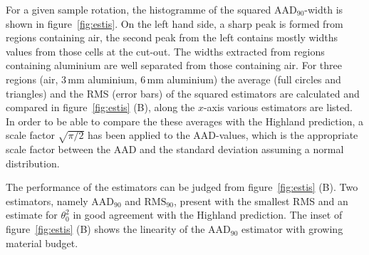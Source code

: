 \documentclass{PoS}
\newcommand{\rmsninety}{\ensuremath{\textrm{RMS}_\textrm{90}}}
\newcommand{\aadninety}{\ensuremath{\textrm{AAD}_\textrm{90}}}
\begin{document}
%

For a given sample rotation, the histogramme of the squared $\aadninety$-width is shown in figure~\ref{fig:estis}.
On the left hand side, a sharp peak is formed from regions containing air, the second peak from the left contains mostly widths values from those cells at the cut-out.
The widths extracted from regions containing aluminium are well separated from those containing air. 
For three regions (air, 3\,mm aluminium, 6\,mm aluminium) the average (full circles and triangles) and the RMS (error bars) of the squared estimators are calculated and compared in figure~\ref{fig:estis} (B), 
 along the $x$-axis various estimators are listed. 
In order to be able to compare the these averages with the Highland prediction, a scale factor $\sqrt{\pi/2}$
 has been applied to the AAD-values, which is the appropriate scale factor between the AAD and the standard deviation assuming a normal distribution. 

The performance of the estimators can be judged from figure~\ref{fig:estis} (B).
Two estimators, namely $\aadninety$ and $\rmsninety$, present with the smallest RMS and an estimate for $\theta_0^2$ in good agreement with the Highland prediction. 
The inset of figure~\ref{fig:estis} (B) shows the linearity of the $\aadninety$ estimator with growing material budget. 
\end{document}
